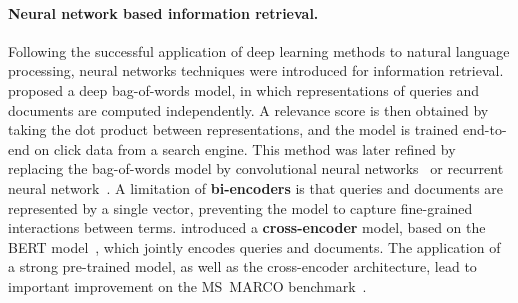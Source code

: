 \documentclass[10pt]{article} %
\begin{document}
\paragraph{Neural network based information retrieval.}
Following the successful application of deep learning methods to natural language processing, neural networks techniques were introduced for information retrieval.
\citet{huang2013learning} proposed a deep bag-of-words model, in which representations of queries and documents are computed independently. %
A relevance score is then obtained by taking the dot product between representations, and the model is trained end-to-end on click data from a search engine.
This method was later refined by replacing the bag-of-words model by convolutional neural networks~\citep{shen2014learning} or recurrent neural network~\citep{palangi2016deep}.
A limitation of \textbf{bi-encoders} is that queries and documents are represented by a single vector, preventing the model to capture fine-grained interactions between terms.
\citet{nogueira2019passage} introduced a \textbf{cross-encoder} model, based on the BERT model~\citep{devlin2018bert}, which jointly encodes queries and documents.
The application of a strong pre-trained model, as well as the cross-encoder architecture, lead to important improvement on the MS~MARCO benchmark~\citep{bajaj2016ms}.
\end{document}
